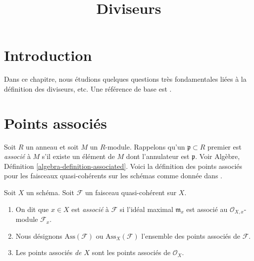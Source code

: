 

%


\title{Diviseurs}


\maketitle

\label{section-phantom}

\tableofcontents

\section{Introduction}
\label{section-introduction}

\noindent
Dans ce chapitre, nous étudions quelques questions très fondamentales liées à la
définition des diviseurs, etc. Une référence de base est  \cite{EGA}.



\section{Points associés}
\label{section-associated}

\noindent
Soit  $R$  un anneau et soit  $M$  un  $R$-module. Rappelons
qu'un  $\mathfrak p \subset R$  premier est  {\it  associé}  à
 $M$  s'il existe un élément de  $M$  dont l'annulateur est
 $\mathfrak p$. Voir Algèbre, Définition  \ref{algebra-definition-associated}. Voici la définition des
points associés pour les faisceaux quasi-cohérents sur les schémas comme donnée
dans  \cite[IV Definition 3.1.1]{EGA}.

\begin{definition}
\label{definition-associated}
Soit  $X$  un schéma. Soit  $\mathcal{F}$  un faisceau quasi-cohérent sur
 $X$.
\begin{enumerate}
\item On dit que  $x \in X$  est  {\it  associé}  à
 $\mathcal{F}$  si l'idéal maximal  $\mathfrak m_x$  est associé au  $\mathcal{O}_{X, x}$-module
 $\mathcal{F}_x$.
\item Nous désignons  $\text{Ass}(\mathcal{F})$  ou  $\text{Ass}_X(\mathcal{F})$  l'ensemble des points associés de
 $\mathcal{F}$.
\item Les points associés  {\it  de  $X$}  sont les
points associés de  $\mathcal{O}_X$.
\end{enumerate}
\end{definition}

